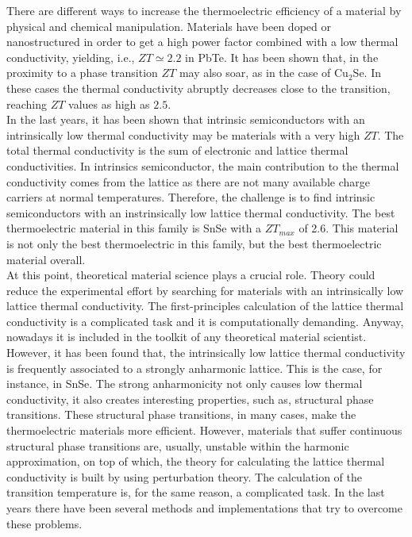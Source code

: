 There are different ways to increase the thermoelectric efficiency of a material by physical and chemical 
manipulation. Materials have been doped\cite{kim2013engineered,pei2011stabilizing,heremans2008enhancement} or
nanostructured\cite{vineis2010nanostructured,minnich2009bulk} in order to get a high power factor combined with a 
low thermal conductivity, yielding, i.e., $ZT\simeq 2.2$ in PbTe\cite{hsu2004cubic}. It has been shown that, in the 
proximity to a phase transition $ZT$ may also soar, as in the case of Cu$_{2}$Se\cite{liu2013ultrahigh}. In these 
cases the thermal conductivity abruptly decreases close to the transition, reaching $ZT$ values as high as $2.5$. \\

In the last years, it has been shown that intrinsic semiconductors with an intrinsically low thermal conductivity 
may be materials with a very high $ZT$\cite{zhao2014ultralow,he2018remarkable}. The total thermal conductivity is 
the sum of electronic and lattice thermal conductivities. In intrinsics semiconductor, the main contribution to the 
thermal conductivity comes from the lattice as there are not many available charge carriers at normal temperatures. 
Therefore, the challenge is to find intrinsic semiconductors with an instrinsically low lattice thermal conductivity. 
The best thermoelectric material in this family is SnSe\cite{zhao2014ultralow} with a $ZT_{max}$ of 2.6. This 
material is not only the best thermoelectric in this family, but the best thermoelectric material overall. \\

At this point, theoretical material science plays a crucial role. Theory could reduce the experimental effort by 
searching for materials with an intrinsically low lattice thermal conductivity. The first-principles calculation of 
the lattice thermal conductivity is a complicated task and it is computationally demanding\cite{broido2007intrinsic}. 
Anyway, nowadays it is included in the toolkit\cite{giannozzi2009quantum} of any theoretical material scientist. 
However, it has been found that, the intrinsically low lattice thermal conductivity is frequently associated to 
a strongly anharmonic lattice\cite{zhao2014ultralow,ribeiro2018strong}. This is the case, for instance, in SnSe. The 
strong anharmonicity not only causes low thermal conductivity, it also creates interesting properties, such as, 
structural phase transitions. These structural phase transitions, in many cases, make the thermoelectric materials 
more efficient\cite{liu2013ultrahigh}. However, materials that suffer continuous structural phase transitions are, 
usually, unstable within the harmonic approximation, on top of which, the theory for calculating the 
lattice thermal conductivity is built by using perturbation theory\cite{paulatto2013anharmonic}. The calculation of 
the transition temperature is, for the same reason, a complicated task. In the last years there have been several 
methods and implementations\cite{hellman2013temperature,ljungberg2013temperature,magduau2013identification} that try 
to overcome these problems. \\

